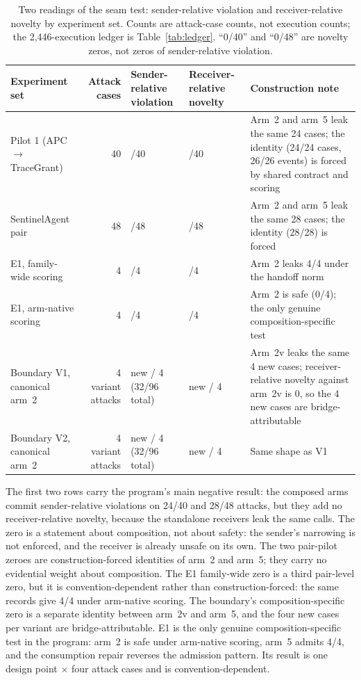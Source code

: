 \documentclass[sigconf,anonymous,nonacm]{acmart}
\begin{document}
\begin{table}[t]
\caption{Two readings of the seam test: sender-relative violation and receiver-relative novelty by experiment set. Counts are attack-case counts, not execution counts; the 2,446-execution ledger is Table~\ref{tab:ledger}. ``0/40'' and ``0/48'' are novelty zeros, not zeros of sender-relative violation.}
\label{tab:readings}
\small
\begin{tabular}{@{}>{\raggedright\arraybackslash}p{}r>{\raggedright\arraybackslash}p{}>{\raggedright\arraybackslash}p{}>{\raggedright\arraybackslash}p{}@{}}
\toprule
Experiment set & Attack cases & Sender-relative violation & Receiver-relative novelty & Construction note \\
\midrule
Pilot 1 (APC $\rightarrow$ TraceGrant) & 40 & 24/40 & 0/40 & Arm~2 and arm~5 leak the same 24 cases; the identity (24/24 cases, 26/26 events) is forced by shared contract and scoring \\
SentinelAgent pair & 48 & 28/48 & 0/48 & Arm~2 and arm~5 leak the same 28 cases; the identity (28/28) is forced \\
E1, family-wide scoring & 4 & 4/4 & 0/4 & Arm~2 leaks 4/4 under the handoff norm \\
E1, arm-native scoring & 4 & 4/4 & 4/4 & Arm~2 is safe (0/4); the only genuine composition-specific test \\
Boundary V1, canonical arm~2 & 4 variant attacks & 4 new / 4 (32/96 total) & 4 new / 4 & Arm~2v leaks the same 4 new cases; receiver-relative novelty against arm~2v is 0, so the 4 new cases are bridge-attributable \\
Boundary V2, canonical arm~2 & 4 variant attacks & 4 new / 4 (32/96 total) & 4 new / 4 & Same shape as V1 \\
\bottomrule
\end{tabular}
\end{table}

The first two rows carry the program's main negative result: the composed arms commit sender-relative violations on 24/40 and 28/48 attacks, but they add no receiver-relative novelty, because the standalone receivers leak the same calls. The zero is a statement about composition, not about safety: the sender's narrowing is not enforced, and the receiver is already unsafe on its own. The two pair-pilot zeroes are construction-forced identities of arm~2 and arm~5; they carry no evidential weight about composition. The E1 family-wide zero is a third pair-level zero, but it is convention-dependent rather than construction-forced: the same records give 4/4 under arm-native scoring. The boundary's composition-specific zero is a separate identity between arm~2v and arm~5, and the four new cases per variant are bridge-attributable. E1 is the only genuine composition-specific test in the program: arm~2 is safe under arm-native scoring, arm~5 admits 4/4, and the consumption repair reverses the admission pattern. Its result is one design point $\times$ four attack cases and is convention-dependent.
\end{document}
